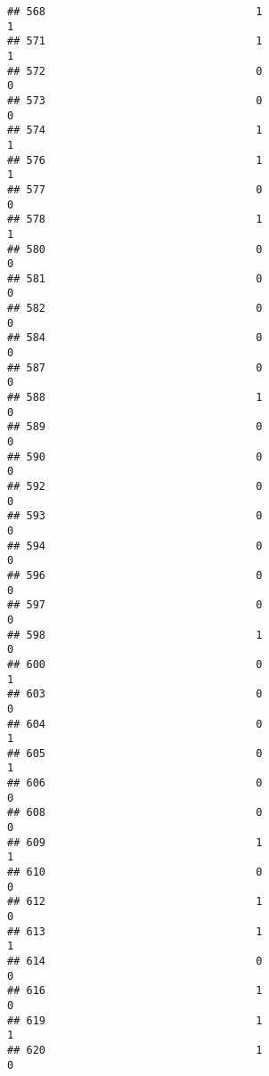 \documentclass[
]{article}
\begin{document}
\begin{verbatim}
## 568                                 1                                1
## 571                                 1                                1
## 572                                 0                                0
## 573                                 0                                0
## 574                                 1                                1
## 576                                 1                                1
## 577                                 0                                0
## 578                                 1                                1
## 580                                 0                                0
## 581                                 0                                0
## 582                                 0                                0
## 584                                 0                                0
## 587                                 0                                0
## 588                                 1                                0
## 589                                 0                                0
## 590                                 0                                0
## 592                                 0                                0
## 593                                 0                                0
## 594                                 0                                0
## 596                                 0                                0
## 597                                 0                                0
## 598                                 1                                0
## 600                                 0                                1
## 603                                 0                                0
## 604                                 0                                1
## 605                                 0                                1
## 606                                 0                                0
## 608                                 0                                0
## 609                                 1                                1
## 610                                 0                                0
## 612                                 1                                0
## 613                                 1                                1
## 614                                 0                                0
## 616                                 1                                0
## 619                                 1                                1
## 620                                 1                                0

\end{verbatim}
\end{document}
